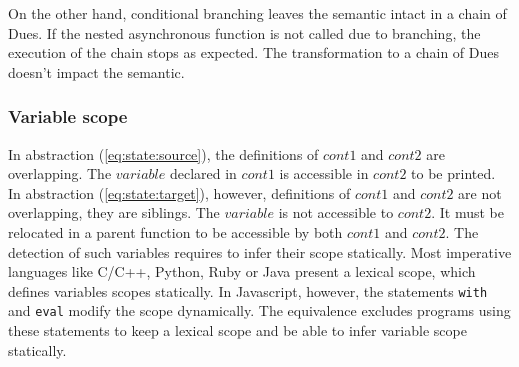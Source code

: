 On the other hand, conditional branching leaves the semantic intact in a chain of Dues.
If the nested asynchronous function is not called due to branching, the execution of the chain stops as expected. %
The transformation to a chain of Dues doesn't impact the semantic.

\subsubsection{Variable scope}

In abstraction (\ref{eq:state:source}), the definitions of $cont1$ and $cont2$ are overlapping.
The $variable$ declared in $cont1$ is accessible in $cont2$ to be printed.
In abstraction (\ref{eq:state:target}), however, definitions of $cont1$ and $cont2$ are not overlapping, they are siblings.
The $variable$ is not accessible to $cont2$.
It must be relocated in a parent function to be accessible by both $cont1$ and $cont2$.
The detection of such variables requires to infer their scope statically.
Most imperative languages like C/C++, Python, Ruby or Java present a lexical scope, which defines variables scopes statically.
In Javascript, however, the statements \texttt{with} and \texttt{eval} modify the scope dynamically.
The equivalence excludes programs using these statements to keep a lexical scope and be able to infer variable scope statically.



